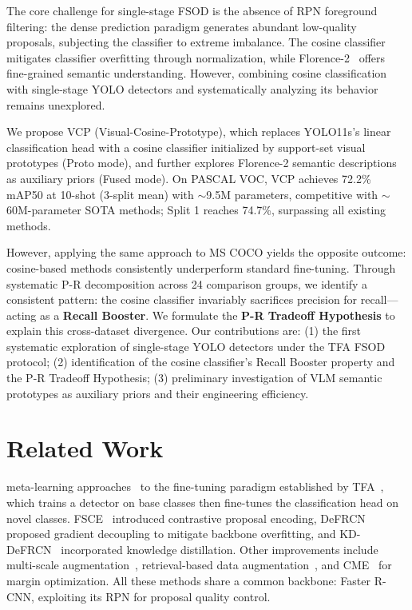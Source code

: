 \documentclass[conference]{IEEEtran}
\begin{document}
The core challenge for single-stage FSOD is the absence of RPN foreground filtering: the dense prediction paradigm generates abundant low-quality proposals, subjecting the classifier to extreme imbalance. The cosine classifier~\cite{wang2020tfa} mitigates classifier overfitting through normalization, while Florence-2~\cite{xiao2024florence2} offers fine-grained semantic understanding. However, combining cosine classification with single-stage YOLO detectors and systematically analyzing its behavior remains unexplored.

We propose VCP (Visual-Cosine-Prototype), which replaces YOLO11s's linear classification head with a cosine classifier initialized by support-set visual prototypes (Proto mode), and further explores Florence-2 semantic descriptions as auxiliary priors (Fused mode). On PASCAL VOC, VCP achieves 72.2\% mAP50 at 10-shot (3-split mean) with $\sim$9.5M parameters, competitive with $\sim$60M-parameter SOTA methods; Split 1 reaches 74.7\%, surpassing all existing methods.

However, applying the same approach to MS COCO yields the opposite outcome: cosine-based methods consistently underperform standard fine-tuning. Through systematic P-R decomposition across 24 comparison groups, we identify a consistent pattern: the cosine classifier invariably sacrifices precision for recall---acting as a \textbf{Recall Booster}. We formulate the \textbf{P-R Tradeoff Hypothesis} to explain this cross-dataset divergence. Our contributions are: (1) the first systematic exploration of single-stage YOLO detectors under the TFA FSOD protocol; (2) identification of the cosine classifier's Recall Booster property and the P-R Tradeoff Hypothesis; (3) preliminary investigation of VLM semantic prototypes as auxiliary priors and their engineering efficiency.

\section{Related Work}

meta-learning approaches~\cite{huang2025prototype,gao2025decoupling} to the fine-tuning paradigm established by TFA~\cite{wang2020tfa}, which trains a detector on base classes then fine-tunes the classification head on novel classes. FSCE~\cite{sun2021fsce} introduced contrastive proposal encoding, DeFRCN~\cite{qiao2021defrcn} proposed gradient decoupling to mitigate backbone overfitting, and KD-DeFRCN~\cite{pei2022kddefrcn} incorporated knowledge distillation. Other improvements include multi-scale augmentation~\cite{vu2025multiperspective}, retrieval-based data augmentation~\cite{li2025domainrag}, and CME~\cite{li2021cme} for margin optimization. All these methods share a common backbone: Faster R-CNN, exploiting its RPN for proposal quality control.
\end{document}

